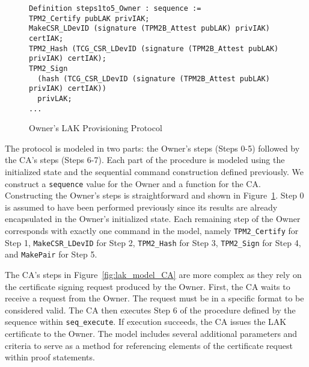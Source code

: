 \documentclass[runningheads]{llncs}
\begin{document}



\begin{figure}[hpbt]
  \vspace{-\medskipamount}
  \vspace{-\medskipamount}
\begin{lstlisting}[language=Coq]
Definition steps1to5_Owner : sequence :=
TPM2_Certify pubLAK privIAK;
MakeCSR_LDevID (signature (TPM2B_Attest pubLAK) privIAK) certIAK;
TPM2_Hash (TCG_CSR_LDevID (signature (TPM2B_Attest pubLAK) privIAK) certIAK);
TPM2_Sign 
  (hash (TCG_CSR_LDevID (signature (TPM2B_Attest pubLAK) privIAK) certIAK))
  privLAK;
...
\end{lstlisting}
\caption{Owner's LAK Provisioning Protocol}
\label{fig:lak_model_Owner}
\end{figure}

The protocol is modeled in two parts: the Owner's steps (Steps 0-5)
followed by the CA's steps (Steps 6-7).  Each part of the procedure is
modeled using the initialized state and the sequential command
construction defined previously.  We construct a \verb|sequence| value
for the Owner and a function for the CA. Constructing the Owner's
steps is straightforward and shown in
Figure~\ref{fig:lak_model_Owner}. Step 0 is assumed to have been
performed previously since its results are already encapsulated in the
Owner's initialized state.  Each remaining step of the Owner
corresponds with exactly one command in the model, namely
\verb|TPM2_Certify| for Step 1, \verb|MakeCSR_LDevID| for Step 2,
\verb|TPM2_Hash| for Step 3, \verb|TPM2_Sign| for Step 4, and
\verb|MakePair| for Step 5.

The CA's steps in Figure~\ref{fig:lak_model_CA} are more complex as
they rely on the certificate signing request produced by the Owner. 
First, the CA waits to receive a request from the
Owner. The request must be in a specific
format to be considered valid. The CA then executes Step 6 of the
procedure defined by the sequence within \verb|seq_execute|. If
execution succeeds, the CA issues the LAK certificate to the Owner.
The model includes several additional parameters and criteria to serve
as a method for referencing elements of the certificate request
within proof statements.
\end{document}
